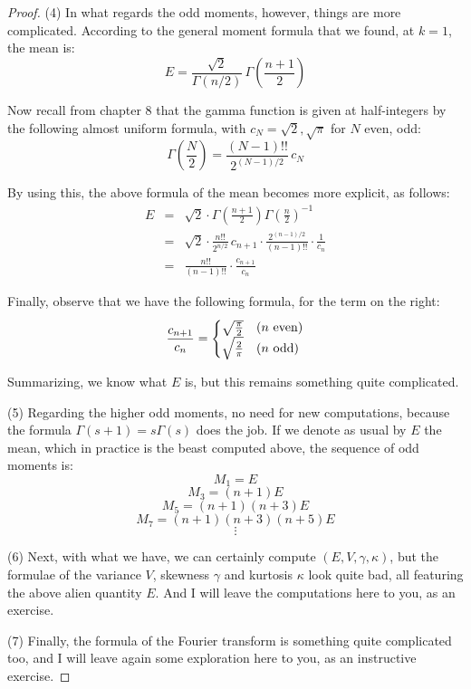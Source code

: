 \documentclass[12pt]{amsbook}
\begin{document}
\begin{proof}
(4) In what regards the odd moments, however, things are more complicated. According to the general moment formula that we found, at $k=1$, the mean is:
$$E=\frac{\sqrt{2}}{\Gamma(n/2)}\,\Gamma\left(\frac{n+1}{2}\right)$$

Now recall from chapter 8 that the gamma function is given at half-integers by the following almost uniform formula, with $c_N=\sqrt{2},\sqrt{\pi}$ for $N$ even, odd:
$$\Gamma\left(\frac{N}{2}\right)=\frac{(N-1)!!}{2^{(N-1)/2}}\,c_N$$

By using this, the above formula of the mean becomes more explicit, as follows:
\begin{eqnarray*}
E
&=&\sqrt{2}\cdot\Gamma\left(\frac{n+1}{2}\right)\Gamma\left(\frac{n}{2}\right)^{-1}\\
&=&\sqrt{2}\cdot\frac{n!!}{2^{n/2}}\,c_{n+1}\cdot\frac{2^{(n-1)/2}}{(n-1)!!}\cdot\frac{1}{c_n}\\
&=&\frac{n!!}{(n-1)!!}\cdot\frac{c_{n+1}}{c_n}
\end{eqnarray*}

Finally, observe that we have the following formula, for the term on the right:
$$\frac{c_{n+1}}{c_n}=\begin{cases}
\sqrt{\frac{\pi}{2}}&(n\ {\rm even})\\
\sqrt{\frac{2}{\pi}}&(n\ {\rm odd})
\end{cases}$$

Summarizing, we know what $E$ is, but this remains something quite complicated.

\medskip

(5) Regarding the higher odd moments, no need for new computations, because the formula $\Gamma(s+1)=s\Gamma(s)$ does the job. If we denote as usual by $E$ the mean, which in practice is the beast computed above, the sequence of odd moments is:
$$M_1=E$$
$$M_3=(n+1)E$$
$$M_5=(n+1)(n+3)E$$
$$M_7=(n+1)(n+3)(n+5)E$$
$$\vdots$$

(6) Next, with what we have, we can certainly compute $(E,V,\gamma,\kappa)$, but the formulae of the variance $V$, skewness $\gamma$ and kurtosis $\kappa$ look quite bad, all featuring the above alien quantity $E$. And I will leave the computations here to you, as an exercise.

\medskip

(7) Finally, the formula of the Fourier transform is something quite complicated too, and I will leave again some exploration here to you, as an instructive exercise.
\end{proof}
\end{document}
